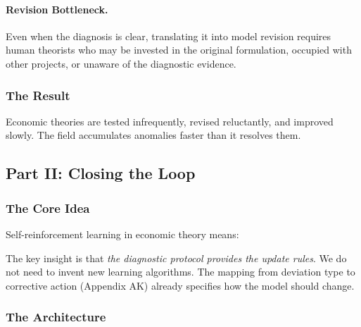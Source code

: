 \paragraph{Revision Bottleneck.}
Even when the diagnosis is clear, translating it into model revision requires 
human theorists who may be invested in the original formulation, occupied with 
other projects, or unaware of the diagnostic evidence.

\subsubsection{The Result}

Economic theories are tested infrequently, revised reluctantly, and improved 
slowly. The field accumulates anomalies faster than it resolves them.

\subsection{Part II: Closing the Loop}

\subsubsection{The Core Idea}

Self-reinforcement learning in economic theory means:

\begin{center}
\end{center}

The key insight is that \emph{the diagnostic protocol provides the update rules}. 
We do not need to invent new learning algorithms. The mapping from deviation 
type to corrective action (Appendix AK) already specifies how the model should 
change.

\subsubsection{The Architecture}

